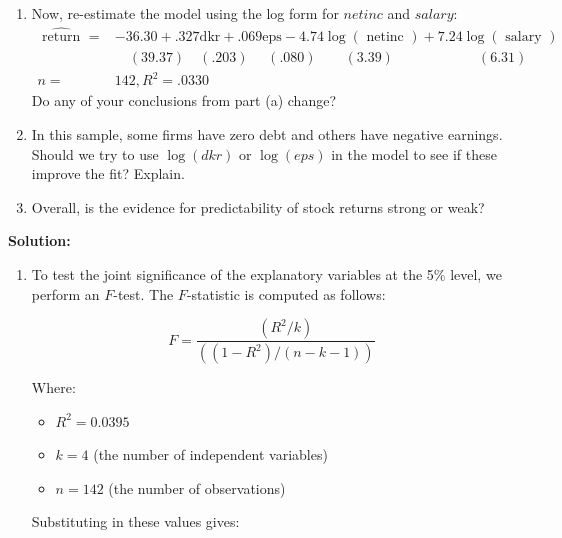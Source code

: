 \documentclass[12pt]{article}
\begin{document}
\begin{enumerate}
\begin{enumerate}
$$
\begin{aligned}
\widehat{\text { return }=}= & -14.37+.321 \mathrm{dkr}+.043 \mathrm{eps}-.0051 \text { nentinc }+.0035 \text { salary } \\
& \quad(6.89)\quad(.201)\quad\quad(.078)\quad\quad(.0047)\quad\quad\quad\quad(.0022) \\
n= & 142, R^2=.0395
\end{aligned}
$$
Test whether the explanatory variables are jointly significant at the $5 \%$ level. Is any explanatory variable individually significant?
\item Now, re-estimate the model using the log form for $netinc$ and $salary$:
$$
\begin{aligned}
\widehat{\text { return }}= & -36.30+.327 \mathrm{dkr}+.069 \mathrm{eps}-4.74 \log (\text { netinc })+7.24 \log (\text { salary }) \\
& \quad(39.37)\quad(.203)\,\,\quad(.080)\quad\quad(3.39)\quad\quad\quad\quad\quad\quad(6.31) \\
n= & 142, R^2=.0330
\end{aligned}
$$
Do any of your conclusions from part (a) change?
\item In this sample, some firms have zero debt and others have negative earnings. Should we try to use $\log (d k r)$ or $\log (e p s)$ in the model to see if these improve the fit? Explain.
\item Overall, is the evidence for predictability of stock returns strong or weak?
\end{enumerate}


{\color{blue}
\noindent \textbf{Solution:}

\begin{enumerate}

\item To test the joint significance of the explanatory variables at the 5\% level, we perform an $F$-test. The $F$-statistic is computed as follows:

\[
F = \frac{(R^2 / k)}{((1 - R^2) / (n - k - 1))}
\]

Where:
\begin{itemize}
    \item $R^2 = 0.0395$
    \item $k = 4$ (the number of independent variables)
    \item $n = 142$ (the number of observations)
\end{itemize}

Substituting in these values gives:


\end{enumerate}}
\end{enumerate}
\end{document}
